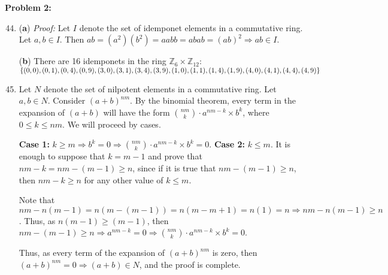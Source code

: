 \documentclass[12pt, letterpaper]{article}
\newenvironment{problem}
    [1]
    {\noindent \textbf{Problem #1:}}
    {\vspace{3mm}}
\begin{document}
\begin{problem}{2}
    \begin{enumerate}
        \setcounter{enumi}{43}

        \item (\textbf{a}) \emph{Proof:} Let $I$ denote the set of idemponet elements in a commutative
        ring. Let $a, b \in I$. Then $ab = (a^2)(b^2) = aabb = abab = (ab)^2 \Rightarrow ab \in I$.

        \bigskip\noindent
        (\textbf{b}) There are 16 idemponets in the ring $\mathbb{Z}_6 \times \mathbb{Z}_{12}$: 
        $\{(0, 0), (0, 1), (0, 4), (0, 9), \\ (3, 0), (3, 1), (3, 4),(3, 9), (1, 0), (1, 1), 
        (1, 4), (1, 9), (4, 0), (4, 1), (4, 4), (4, 9)\}$

        \setcounter{enumi}{45}

        \item Let $N$ denote the set of nilpotent elements in a commutative ring. Let $a, b \in N$.
        Consider $(a + b)^{nm}$. By the binomial theorem, every term in the expansion of $(a + b)$ will
        have the form $\binom{nm}{k} \cdot a^{nm-k} \times b^k$, where $0 \le k \le nm$. We will proceed
        by cases.

        \bigskip\noindent
        \textbf{Case 1:} $k \ge m \Rightarrow b^k = 0 \Rightarrow \binom{nm}{k} \cdot a^{nm-k} \times b^k = 0$.
        \textbf{Case 2:} $k \le m$. It is enough to suppose that $k = m - 1$ and prove that $nm-k = nm - (m-1) \ge n$,
        since if it is true that $nm - (m-1) \ge n$, then $nm - k \ge n$ for any other value of $k \le m$.

        \bigskip\noindent
        Note that $nm - n(m - 1)  = n(m - (m - 1)) = n(m - m + 1) = n(1) = n \Rightarrow nm - n(m - 1) \ge n$. Thus,
        as $n(m - 1) \ge (m - 1)$, then $nm - (m-1) \ge n \Rightarrow a^{nm-k} = 0 \Rightarrow \binom{nm}{k} \cdot a^{nm-k} 
        \times b^k = 0$.

        \bigskip\noindent
        Thus, as every term of the expansion of $(a + b)^{nm}$ is zero, then $(a+b)^{nm} = 0 \Rightarrow (a+b) \in N$, and the
        proof is complete.
    \end{enumerate}
\end{problem}
\end{document}

